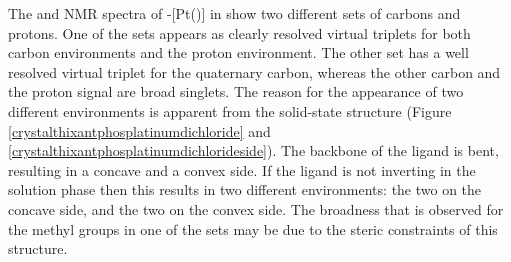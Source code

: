 %
%

The \proton{} and \carbon{} NMR spectra of \trans-[Pt(\tButhixantphos)] in  show two different sets of \tBu{} carbons and protons.  One of the sets appears as clearly resolved virtual triplets for both carbon environments and the proton environment.  The other set has a well resolved virtual triplet for the quaternary carbon, whereas the other carbon and the proton signal are broad singlets.  The reason for the appearance of two different \tBu{} environments is apparent from the solid-state structure (Figure \ref{crystalthixantphosplatinumdichloride} and \ref{crystalthixantphosplatinumdichlorideside}).  The backbone of the \tButhixantphos{} ligand is bent, resulting in a concave and a convex side.  If the ligand is not inverting in the solution phase then this results in two different \tBu{} environments: the two on the concave side, and the two on the convex side.  The broadness that is observed for the methyl groups in one of the sets may be due to the steric constraints of this structure.  

